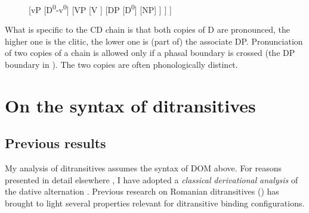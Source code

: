 \documentclass[output=paper,colorlinks,citecolor=brown,nonflat]{./langscibook}
\begin{document}
\begin{figure}%
	\begin{forest}
	[vP
		[D\textsuperscript{0}-v\textsuperscript{0}]
		[VP
			[V
			]
			[DP
				[D\textsuperscript{0}]
				[NP]
			]
		]
	]	
	\end{forest}
	\caption{\label{fig:cornilescu:6} \missingcaption}
\end{figure}

What is specific to the CD chain is that both copies of D are pronounced, the higher one is the clitic, the lower one is (part of) the associate DP. Pronunciation of two copies of a chain is allowed only if a phasal boundary is crossed (the DP boundary in ). The two copies are often phonologically distinct. 

\section{On the syntax of ditransitives} %

\subsection{{Previous} {results}}%

My analysis of ditransitives assumes the syntax of DOM above. For reasons presented in detail elsewhere \citep{CornilescuDinuTigău2017DOC}, I have adopted a \textit{classical} \textit{derivational} \textit{analysis} of the dative alternation \citep{HaradaLarson2009, OrmazabalRomero2017}. Previous research on Romanian ditransitives (\citealt{DiaconescuRivero2007, CornilescuDinuTigău2017DOC}) has brought to light several properties relevant for ditransitive binding configurations.
\end{document}
